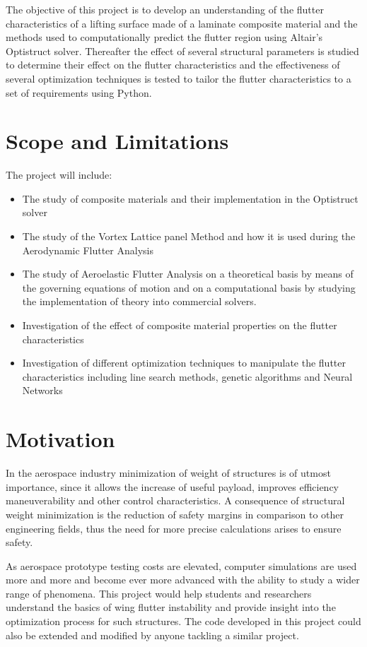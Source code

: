 The objective of this project is to develop an understanding of the
flutter characteristics of a lifting surface made of a laminate
composite material and the methods used to computationally predict the
flutter region using Altair's Optistruct solver. Thereafter the effect
of several structural parameters is studied to determine their effect on
the flutter characteristics and the effectiveness of several
optimization techniques is tested to tailor the flutter characteristics
to a set of requirements using Python.

\section{Scope and Limitations}\label{scope-and-limitations}

The project will include:

\begin{itemize}
\item
  The study of composite materials and their implementation in the
  Optistruct solver
\item
  The study of the Vortex Lattice panel Method and how it is used during
  the Aerodynamic Flutter Analysis
\item
  The study of Aeroelastic Flutter Analysis on a theoretical basis by
  means of the governing equations of motion and on a computational
  basis by studying the implementation of theory into commercial
  solvers.
\item
  Investigation of the effect of composite material properties on the
  flutter characteristics
\item
  Investigation of different optimization techniques to manipulate the
  flutter characteristics including line search methods, genetic
  algorithms and Neural Networks
\end{itemize}

\section{Motivation}\label{motivation}

In the aerospace industry minimization of weight of structures is of
utmost importance, since it allows the increase of useful payload,
improves efficiency maneuverability and other control characteristics. A
consequence of structural weight minimization is the reduction of safety
margins in comparison to other engineering fields, thus the need for
more precise calculations arises to ensure safety.

As aerospace prototype testing costs are elevated, computer simulations
are used more and more and become ever more advanced with the ability to
study a wider range of phenomena. This project would help students and
researchers understand the basics of wing flutter instability and
provide insight into the optimization process for such structures. The
code developed in this project could also be extended and modified by
anyone tackling a similar project.
